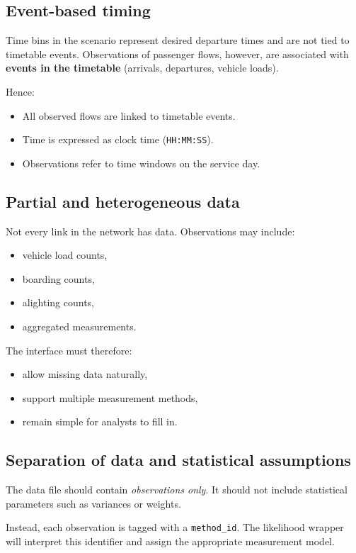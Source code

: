 \documentclass[11pt,a4paper]{article}
\begin{document}
\subsection{Event-based timing}

Time bins in the scenario represent desired departure times and are not tied
to timetable events. Observations of passenger flows, however, are associated
with \textbf{events in the timetable} (arrivals, departures, vehicle loads).

Hence:
\begin{itemize}
    \item All observed flows are linked to timetable events.
    \item Time is expressed as clock time (\texttt{HH:MM:SS}).
    \item Observations refer to time windows on the service day.
\end{itemize}

\subsection{Partial and heterogeneous data}

Not every link in the network has data. Observations may include:
\begin{itemize}
    \item vehicle load counts,
    \item boarding counts,
    \item alighting counts,
    \item aggregated measurements.
\end{itemize}

The interface must therefore:
\begin{itemize}
    \item allow missing data naturally,
    \item support multiple measurement methods,
    \item remain simple for analysts to fill in.
\end{itemize}

\subsection{Separation of data and statistical assumptions}

The data file should contain \emph{observations only}.  
It should not include statistical parameters such as variances or weights.

Instead, each observation is tagged with a \texttt{method\_id}.  
The likelihood wrapper will interpret this identifier and assign the appropriate
measurement model.
\end{document}
